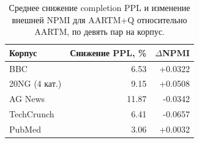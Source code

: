 \begin{table}[H]
\centering
\small
\caption{Среднее снижение completion PPL и изменение внешней NPMI для AARTM+Q относительно AARTM, по девять пар на корпус.}
\label{tab:small}
\begin{tabular}{lrr}
\toprule
Корпус & Снижение PPL, \% & $\Delta$NPMI \\
\midrule
BBC & 6.53 & +0.0322 \\
20NG (4 кат.) & 9.15 & +0.0508 \\
AG News & 11.87 & -0.0342 \\
TechCrunch & 6.41 & -0.0657 \\
PubMed & 3.06 & +0.0032 \\
\bottomrule
\end{tabular}
\end{table}

